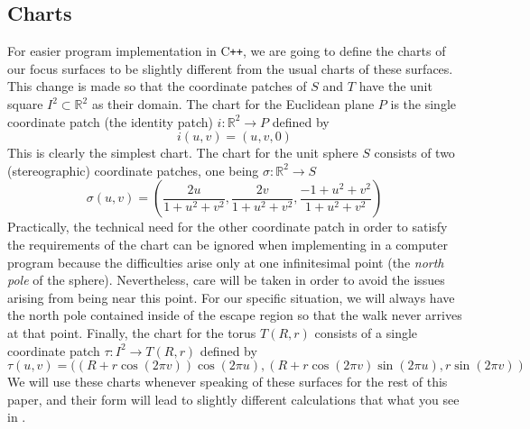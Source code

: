 \documentclass{article}
\newcommand{\R}{\mathbb{R}}
\begin{document}
	\subsection{Charts}
		For easier program implementation in C\texttt{++}, we are going to define the charts of our focus surfaces to be slightly different from the usual charts of these surfaces.
		This change is made so that the coordinate patches of $S$ and $T$ have the unit square $I^2 \subset \R^2$ as their domain.
		The chart for the Euclidean plane $P$ is the single coordinate patch (the identity patch) $i: \R^2 \to P$ defined by
		$$ i(u,v) = ( u , v , 0 ) $$
		This is clearly the simplest chart.
		The chart for the unit sphere $S$ consists of two (stereographic) coordinate patches, one being $\sigma:\R^2 \to S$
		$$ \sigma(u,v) = \left( \frac{2u}{1+u^2+v^2} , \frac{2v}{1+u^2+v^2} , \frac{-1+u^2+v^2}{1+u^2+v^2} \right) $$
		Practically, the technical need for the other coordinate patch in order to satisfy the requirements of the chart can be ignored when implementing in a computer program because the difficulties arise only at one infinitesimal point (the \textit{north pole} of the sphere).
		Nevertheless, care will be taken in order to avoid the issues arising from being near this point.
		For our specific situation, we will always have the north pole contained inside of the escape region so that the walk never arrives at that point. 
		Finally, the chart for the torus $T(R,r)$ consists of a single coordinate patch $\tau:I^2 \to T(R,r)$ defined by
		$$ \tau(u,v) = ( (R+r\cos(2\pi v))\cos(2\pi u) , (R+r\cos(2\pi v)\sin(2\pi u) , r\sin(2\pi v) ) $$
		We will use these charts whenever speaking of these surfaces for the rest of this paper, and their form will lead to slightly different calculations that what you see in \cite{BanchoffLovett_DiffGeo_2010,Irons_GeodesicsTorus_2005}.
		
\end{document}
